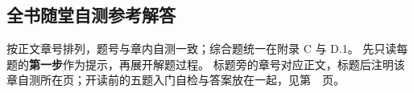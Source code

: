 \subsection{全书随堂自测参考解答}
\label{app:chapter-checks}

按正文章号排列，题号与章内自测一致；综合题统一在附录 C 与 D.1。
先只读每题的\textbf{第一步}作为提示，再展开解题过程。
标题旁的章号对应正文，标题后注明该章自测所在页；开读前的五题入门自检与答案放在一起，见第~\pageref*{app:math-entry}~页。
\newcommand{\answercheckpage}[1]{\enspace{\mdseries\footnotesize\hyperref[check:#1]{（题目见第~\pageref*{check:#1}~页）}}}

\newcommand{\answerpiece}[3]{%
  \par\smallskip\noindent
  {\sffamily\bfseries\color{blue}题~#1 \textnormal{·} #2}\par\nobreak
  \noindent\textbf{第一步：}#3\par\nobreak
  \noindent\textbf{解题过程：}\ignorespaces
}
\begingroup
\setlength{\parskip}{3pt}
